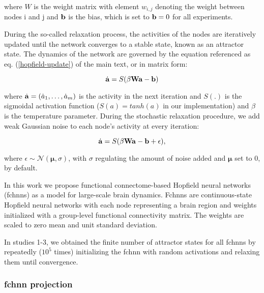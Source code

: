 \documentclass{article}
\begin{document}
where $W$ is the weight matrix with element $w_{i,j}$ denoting the weight between nodes i and j and $\bold{b}$ is the bias, which is set to $\bold{b} = 0$ for all experiments.

During the so-called relaxation process, the activities of the nodes are iteratively updated until the network converges to a stable state, known as an attractor state. The dynamics of the network are governed by the equation referenced as eq. (\ref{hopfield-update}) of the main text, or in matrix form:

\begin{equation}
\label{hopfield-update-matrix}
\dot{\bold{a}} = S(\beta \bold{W} \bold{a} - \bold{b})
\end{equation}

where $\dot{\bold{a}} = (\dot{a}_1, \dots, \dot{a}_m)$ is the activity in the next iteration and $S(.)$ is the sigmoidal activation function ($S(a) = tanh(a)$ in our implementation) and $\beta$ is the temperature parameter.
During the stochastic relaxation procedure, we add weak Gaussian noise to each node's activity at every iteration:

\begin{equation}
\label{hopfield-update-matrix-stochastic}
\dot{\bold{a}} = S(\beta \bold{W} \bold{a} - \bold{b}  + \epsilon),
\end{equation}

where $\epsilon \sim \mathcal{N}(\mathbf{\mu}, \sigma)$, with $\sigma$ regulating the amount of noise added and $\mathbf{\mu}$ set to 0, by default.

In this work we propose functional connectome-based Hopfield neural networks (\acrshort{fchnn}s) as a model for large-scale brain dynamics.
Fc\acrshort{hnn}s are continuous-state Hopfield neural networks with each node representing a brain region and weights initialized with a group-level functional connectivity matrix. The weights are scaled to zero mean and unit standard deviation.

In studies 1-3, we obtained the finite number of attractor states for all \acrshort{fchnn}s by repeate\acrshort{dl}y ($10^5$ times) initializing the \acrshort{fchnn} with random activations and relaxing them until convergence.

\subsubsection{\acrshort{fchnn} projection}
\end{document}
